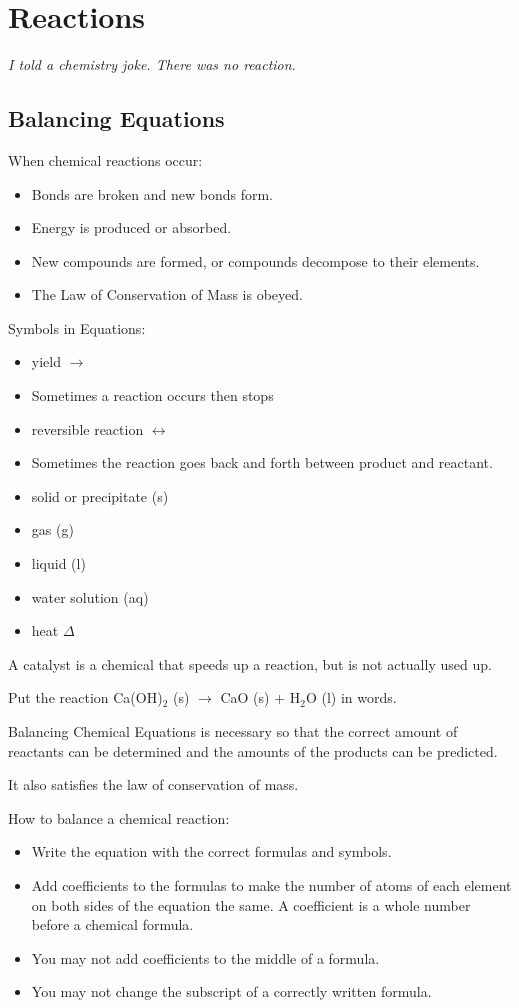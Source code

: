 \documentclass[../hchem.tex]{subfiles}
\begin{document}
\chapter{Reactions}
\textit{I told a chemistry joke. There was no reaction.}

\section{Balancing Equations}
When chemical reactions occur:
\begin{itemize}
    \item Bonds are broken and new bonds form.
    \item Energy is produced or absorbed.
    \item New compounds are formed, or compounds decompose to their elements.
    \item The Law of Conservation of Mass is obeyed.
\end{itemize}

Symbols in Equations:
\begin{itemize}
    \item yield $\rightarrow$
    \item Sometimes a reaction occurs then stops 
    
    \item reversible reaction $\leftrightarrow$
    \item Sometimes the reaction goes back and forth between product and reactant.
    
    \item solid or precipitate (s)
    \item gas (g)
    \item liquid (l)
    \item water solution (aq)
    
    \item heat $\Delta$
\end{itemize}

A catalyst is a chemical that speeds up a reaction, but is not actually used up.

\ex Put the reaction Ca(OH)$_2$ (s) $\rightarrow$ CaO (s) + H$_2$O (l) in words. 

Balancing Chemical Equations is necessary so that the correct amount of reactants can be determined and the amounts of the products can be predicted.

It also satisfies the law of conservation of mass.

How to balance a chemical reaction:
\begin{itemize}
    \item Write the equation with the correct formulas and symbols.
    \item Add coefficients to the formulas to make the number of atoms of each element on both sides of the equation the same. A coefficient is a whole number before a chemical formula.
    \item You may not add coefficients to the middle of a formula.
    \item You may not change the subscript of a correctly written formula.
\end{itemize}
\end{document}
